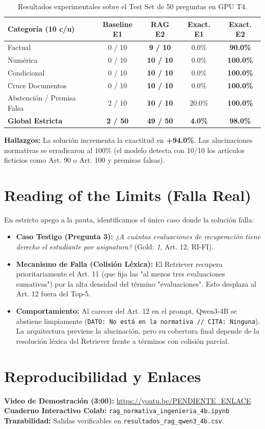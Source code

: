 \documentclass[10pt,twocolumn,letterpaper]{article}
\begin{document}
\vspace{-2pt}
\begin{table}[h]
\centering
\fontsize{7pt}{8.5pt}\selectfont
\begin{tabular}{lcccc}
\toprule
\textbf{Categoría (10 c/u)} & \textbf{Baseline E1} & \textbf{RAG E2} & \textbf{Exact. E1} & \textbf{Exact. E2} \\
\midrule
Factual                     & 0 / 10 & \textbf{9 / 10}  & 0.0\%  & \textbf{90.0\%} \\
Numérica                    & 0 / 10 & \textbf{10 / 10} & 0.0\%  & \textbf{100.0\%} \\
Condicional                 & 0 / 10 & \textbf{10 / 10} & 0.0\%  & \textbf{100.0\%} \\
Cruce Documentos            & 0 / 10 & \textbf{10 / 10} & 0.0\%  & \textbf{100.0\%} \\
Abstención / Premisa Falsa  & 2 / 10 & \textbf{10 / 10} & 20.0\% & \textbf{100.0\%} \\
\midrule
\textbf{Global Estricta}    & \textbf{2 / 50} & \textbf{49 / 50} & \textbf{4.0\%} & \textbf{98.0\%} \\
\bottomrule
\end{tabular}
\vspace{-4pt}
\caption{\footnotesize Resultados experimentales sobre el Test Set de 50 preguntas en GPU T4.}
\vspace{-6pt}
\end{table}

\textbf{Hallazgos:} La solución incrementa la exactitud en \textbf{+94.0\%}. Las alucinaciones normativas se erradicaron al 100\% (el modelo detecta con 10/10 los artículos ficticios como Art. 90 o Art. 100 y premisas falsas).

\section{Reading of the Limits (Falla Real)}
En estricto apego a la pauta, identificamos el único caso donde la solución falla:
\begin{itemize}[leftmargin=*,noitemsep,topsep=1pt]
    \item \textbf{Caso Testigo (Pregunta 3):} \textit{¿A cuántas evaluaciones de recuperación tiene derecho el estudiante por asignatura?} (Gold: \textit{1}, Art. 12, RI-FI).
    \item \textbf{Mecanismo de Falla (Colisión Léxica):} El Retriever recupera prioritariamente el Art. 11 (que fija las "al menos tres evaluaciones sumativas") por la alta densidad del término "evaluaciones". Esto desplaza al Art. 12 fuera del Top-5.
    \item \textbf{Comportamiento:} Al carecer del Art. 12 en el prompt, Qwen3-4B se abstiene limpiamente (\texttt{DATO: No está en la normativa // CITA: Ninguna}). La arquitectura previene la alucinación, pero su cobertura final depende de la resolución léxica del Retriever frente a términos con colisión parcial.
\end{itemize}

\section{Reproducibilidad y Enlaces}
\textbf{Video de Demostración (3:00):} \url{https://youtu.be/PENDIENTE_ENLACE} \\
\textbf{Cuaderno Interactivo Colab:} \texttt{rag\_normativa\_ingenieria\_4b.ipynb} \\
\textbf{Trazabilidad:} Salidas verificables en \texttt{resultados\_rag\_qwen3\_4b.csv}.
\end{document}
